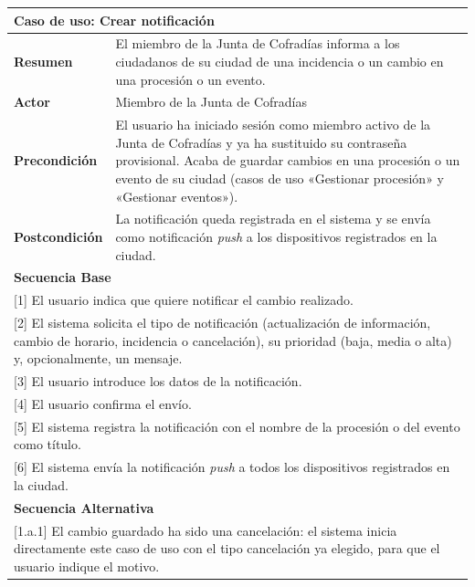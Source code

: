 \begin{table}[h!]
    \begin{tabular}{|p{4cm}|p{11cm}|}
        \hline
        \multicolumn{2}{|l|}{\textbf{Caso de uso: Crear notificación}} \\
        \hline
        \textbf{Resumen} & El miembro de la Junta de Cofradías informa a los ciudadanos de su ciudad de una incidencia o un cambio en una procesión o un evento. \\
        \hline
        \textbf{Actor} & Miembro de la Junta de Cofradías \\
        \hline
        \textbf{Precondición} & El usuario ha iniciado sesión como miembro activo de la Junta de Cofradías y ya ha sustituido su contraseña provisional. Acaba de guardar cambios en una procesión o un evento de su ciudad (casos de uso «Gestionar procesión» y «Gestionar eventos»). \\
        \hline
        \textbf{Postcondición} & La notificación queda registrada en el sistema y se envía como notificación \emph{push} a los dispositivos registrados en la ciudad. \\
        \hline
        \multicolumn{2}{|l|}{\textbf{Secuencia Base}} \\
        \hline
        \multicolumn{2}{|p{15cm}|}{ [1] El usuario indica que quiere notificar el cambio realizado. } \\
        \hline
        \multicolumn{2}{|p{15cm}|}{ [2] El sistema solicita el tipo de notificación (actualización de información, cambio de horario, incidencia o cancelación), su prioridad (baja, media o alta) y, opcionalmente, un mensaje. } \\
        \hline
        \multicolumn{2}{|p{15cm}|}{ [3] El usuario introduce los datos de la notificación. } \\
        \hline
        \multicolumn{2}{|p{15cm}|}{ [4] El usuario confirma el envío. } \\
        \hline
        \multicolumn{2}{|p{15cm}|}{ [5] El sistema registra la notificación con el nombre de la procesión o del evento como título. } \\
        \hline
        \multicolumn{2}{|p{15cm}|}{ [6] El sistema envía la notificación \emph{push} a todos los dispositivos registrados en la ciudad. } \\
        \hline
        \multicolumn{2}{|l|}{\textbf{Secuencia Alternativa}} \\
        \hline
        \multicolumn{2}{|p{15cm}|}{ [1.a.1] El cambio guardado ha sido una cancelación: el sistema inicia directamente este caso de uso con el tipo cancelación ya elegido, para que el usuario indique el motivo. } \\

\end{tabular}
\end{table}
